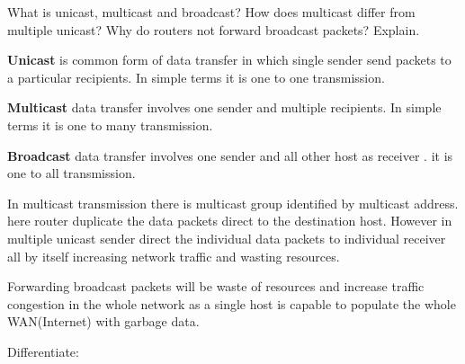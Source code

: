 \documentclass[a4paper,11pt]{article}
\begin{document}
\begin{Q}
    {
        What is unicast, multicast and broadcast? How does multicast differ from multiple unicast?
        Why do routers not forward broadcast packets? Explain.
    }
\end{Q}
\begin{A}
    {
        \textbf{Unicast} is common form of data transfer in which single sender send packets to a particular recipients. In simple terms it is one to one transmission.


        \textbf{Multicast} data transfer involves one sender and multiple recipients. In simple terms it is  one to many transmission.

        \textbf{Broadcast} data transfer involves one sender and all other host as receiver . it is one to all transmission.


        In multicast transmission there is multicast group identified by multicast address. here router duplicate the data packets direct to the destination host. However in multiple unicast sender direct the individual data packets to individual receiver all by itself increasing network traffic and wasting resources.


        Forwarding broadcast packets will be waste of resources and increase traffic congestion in the whole network as a single host is capable to populate the whole WAN(Internet) with garbage data.
    }
\end{A}


\begin{Q}
    {
        Differentiate:
    }
\end{Q}
\end{document}
